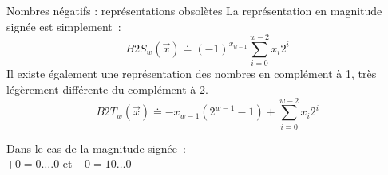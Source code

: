 \begin{frame}{Nombres négatifs : représentations obsolètes}
  \bigskip
  \small
  La représentation en magnitude signée est simplement~:
  \[
    B2S_w(\vec{x}) \doteq (-1)^{x_{w-1}} \sum_{i=0}^{w-2} x_i 2^i
  \]
  Il existe également une représentation des nombres en complément à 1,
  très légèrement différente du complément à 2.
  \[
    B2T_w(\vec{x}) \doteq -x_{w-1}(2^{w-1}-1) + \sum_{i=0}^{w-2} x_i 2^i
  \]

  \bigskip
  \begin{center}
  \end{center}

  \normalsize
  Dans le cas de la magnitude signée~:\\
  $+0 = 0\ldots.0$ et $-0 = 10\ldots0$
\end{frame}

